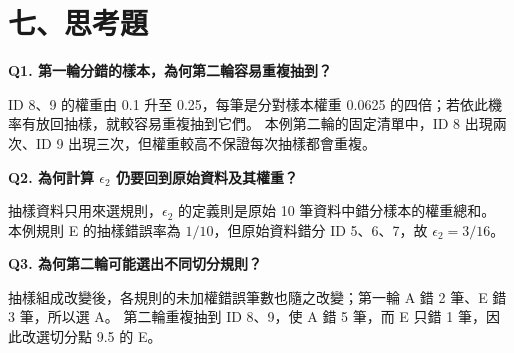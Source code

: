 \section*{七、思考題}
\textbf{Q1. 第一輪分錯的樣本，為何第二輪容易重複抽到？}

ID 8、9 的權重由 0.1 升至 0.25，每筆是分對樣本權重 0.0625 的四倍；若依此機率有放回抽樣，就較容易重複抽到它們。
本例第二輪的固定清單中，ID 8 出現兩次、ID 9 出現三次，但權重較高不保證每次抽樣都會重複。

\textbf{Q2. 為何計算 $\epsilon_2$ 仍要回到原始資料及其權重？}

抽樣資料只用來選規則，$\epsilon_2$ 的定義則是原始 10 筆資料中錯分樣本的權重總和。
本例規則 E 的抽樣錯誤率為 $1/10$，但原始資料錯分 ID 5、6、7，故 $\epsilon_2=3/16$。

\textbf{Q3. 為何第二輪可能選出不同切分規則？}

抽樣組成改變後，各規則的未加權錯誤筆數也隨之改變；第一輪 A 錯 2 筆、E 錯 3 筆，所以選 A。
第二輪重複抽到 ID 8、9，使 A 錯 5 筆，而 E 只錯 1 筆，因此改選切分點 9.5 的 E。

